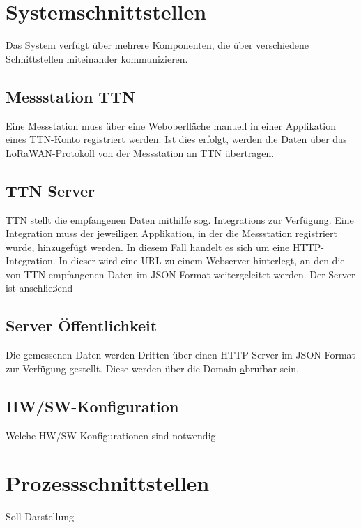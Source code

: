 \documentclass[
11pt,
a4paper,
ngerman,
]{article}
\newcommand{\descriptionWhat}[1]{%
	\begin{itshape}%
	#1 \\%
	\end{itshape}%
}
\begin{document}
\section{Systemschnittstellen}

Das System verf\"ugt \"uber mehrere Komponenten, die \"uber verschiedene
Schnittstellen miteinander kommunizieren.

\subsection{Messstation \rightarrow TTN}
Eine Messstation muss \"uber eine Weboberfl\"ache manuell in einer Applikation
eines TTN-Konto registriert werden. Ist dies erfolgt, werden die Daten \"uber
das LoRaWAN-Protokoll von der Messstation an TTN \"ubertragen.

\subsection{TTN \rightarrow Server}
TTN stellt die empfangenen Daten mithilfe sog. \glqq Integrations\grqq{} zur Verf\"ugung.
Eine \glqq Integration\grqq{} muss der jeweiligen Applikation, in der die Messstation registriert
wurde, hinzugef\"ugt werden.
In diesem Fall handelt es sich um eine \glqq HTTP-Integration\grqq. In dieser wird eine URL zu
einem Webserver hinterlegt, an den die von TTN empfangenen Daten im JSON-Format
weitergeleitet werden. Der Server ist anschlie{\ss}end

\subsection{Server \rightarrow \"Offentlichkeit}
Die gemessenen Daten werden Dritten \"uber einen HTTP-Server im JSON-Format zur Verf\"ugung gestellt.
Diese werden \"uber die Domain \href{http://www.berlinerdaten.de/} abrufbar sein.


\subsection{HW/SW-Konfiguration}

\descriptionWhat{Welche HW/SW-Konfigurationen sind notwendig}

\newpage

\section{Prozessschnittstellen}

\descriptionWhat{Soll-Darstellung}
\end{document}
